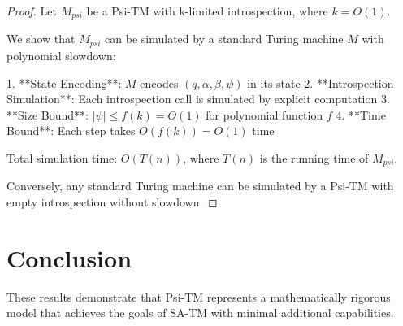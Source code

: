 \documentclass[11pt]{article}
\begin{document}
\begin{proof}
Let $M_{psi}$ be a Psi-TM with k-limited introspection, where $k = O(1)$.

We show that $M_{psi}$ can be simulated by a standard Turing machine $M$ with polynomial slowdown:

1. **State Encoding**: $M$ encodes $(q, \alpha, \beta, \psi)$ in its state
2. **Introspection Simulation**: Each introspection call is simulated by explicit computation
3. **Size Bound**: $|\psi| \leq f(k) = O(1)$ for polynomial function $f$
4. **Time Bound**: Each step takes $O(f(k)) = O(1)$ time

Total simulation time: $O(T(n))$, where $T(n)$ is the running time of $M_{psi}$.

Conversely, any standard Turing machine can be simulated by a Psi-TM with empty introspection without slowdown.
\end{proof}

\section{Conclusion}

These results demonstrate that Psi-TM represents a mathematically rigorous model that achieves the goals of SA-TM with minimal additional capabilities.
\end{document}
